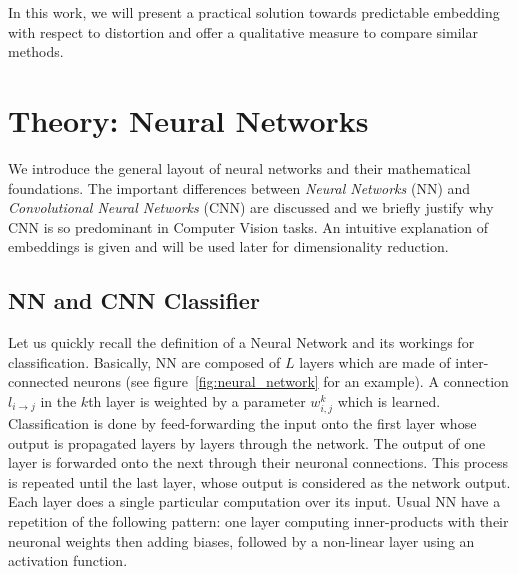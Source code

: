 \documentclass[a4paper,12pt]{report}
\begin{document}
In this work, we will present a practical solution towards predictable embedding with respect to distortion and offer a qualitative measure to compare similar methods. %


\chapter{Theory: Neural Networks}
\label{chap:neural_network}
We introduce the general layout of neural networks and their mathematical foundations.
The important differences between {\em Neural Networks} (NN) and {\em Convolutional Neural Networks} (CNN) are discussed and we briefly justify why CNN is so predominant in Computer Vision tasks.
An intuitive explanation of embeddings is given and will be used later for dimensionality reduction.

\section{NN and CNN Classifier}

Let us quickly recall the definition of a Neural Network and its workings for classification.
Basically, NN are composed of $L$ layers which are made of inter-connected neurons (see figure~\ref{fig:neural_network} for an example).
A connection $l_{i \rightarrow j}$ in the $k$th layer is weighted by a parameter $w^k_{i,j}$ which is learned.
Classification is done by feed-forwarding the input onto the first layer whose output is propagated layers by layers through the network.
The output of one layer is forwarded onto the next through their neuronal connections.
This process is repeated until the last layer, whose output is considered as the network output.
Each layer does a single particular computation over its input.
Usual NN have a repetition of the following pattern: one layer computing inner-products with their neuronal weights then adding biases, followed by a non-linear layer using an activation function.
\end{document}
